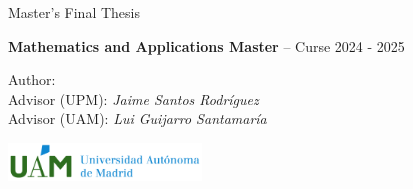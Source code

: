 \documentclass[aspectratio=169]{beamer}
\begin{document}
\begin{frame}[plain]

\begin{center}

  \bigskip  \bigskip

  \begin{Large} \textcolor{green}{\textbf{\projecttitle}} \end{Large} \bigskip \bigskip

  \begin{footnotesize} \textrm{Master's Final Thesis} \\ \end{footnotesize} \bigskip \bigskip

  \begin{footnotesize} \textbf{Mathematics and Applications Master} -- Curse 2024 - 2025 \end{footnotesize} \bigskip \bigskip

  \begin{footnotesize} \textsf{Author:} \textit{\authorname} \\
  \smallskip \textsf{Advisor (UPM):} \textit{Jaime Santos Rodríguez} \\
  \smallskip \textsf{Advisor (UAM):} \textit{Lui Guijarro Santamaría} \\
\end{footnotesize} \bigskip \bigskip


  \includegraphics[height=1cm]{../figures/marcaUAM_AhorizontalColor_imp.pdf}

\end{center}

\end{frame}
\end{document}
